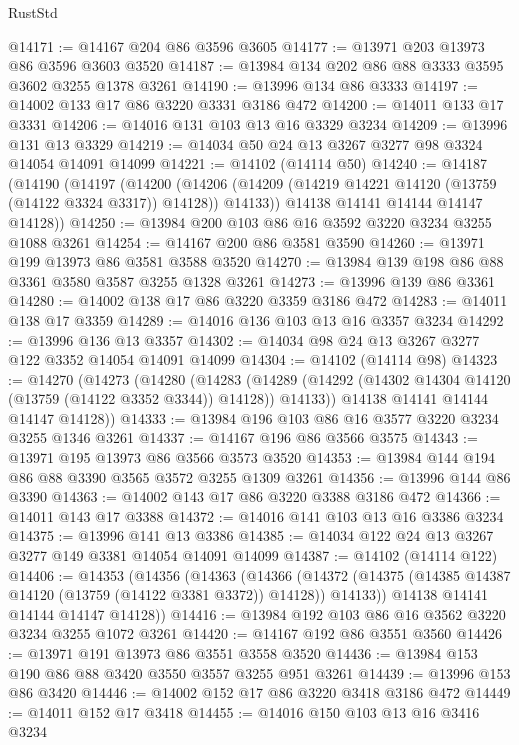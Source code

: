 \begin{lexlean}{RustStd}
\begin{coremodule}
@14171 := @14167 @204 @86 @3596 @3605
@14177 := @13971 @203 @13973 @86 @3596 @3603 @3520
@14187 := @13984 @134 @202 @86 @88 @3333 @3595 @3602 @3255 @1378 @3261
@14190 := @13996 @134 @86 @3333
@14197 := @14002 @133 @17 @86 @3220 @3331 @3186 @472
@14200 := @14011 @133 @17 @3331
@14206 := @14016 @131 @103 @13 @16 @3329 @3234
@14209 := @13996 @131 @13 @3329
@14219 := @14034 @50 @24 @13 @3267 @3277 @98 @3324 @14054 @14091 @14099
@14221 := @14102 (@14114 @50)
@14240 := @14187
    (@14190
      (@14197
        (@14200
          (@14206 (@14209 (@14219 @14221 @14120 (@13759 (@14122 @3324 @3317)) @14128)) @14133))
        @14138
        @14141
        @14144
        @14147
        @14128))
@14250 := @13984 @200 @103 @86 @16 @3592 @3220 @3234 @3255 @1088 @3261
@14254 := @14167 @200 @86 @3581 @3590
@14260 := @13971 @199 @13973 @86 @3581 @3588 @3520
@14270 := @13984 @139 @198 @86 @88 @3361 @3580 @3587 @3255 @1328 @3261
@14273 := @13996 @139 @86 @3361
@14280 := @14002 @138 @17 @86 @3220 @3359 @3186 @472
@14283 := @14011 @138 @17 @3359
@14289 := @14016 @136 @103 @13 @16 @3357 @3234
@14292 := @13996 @136 @13 @3357
@14302 := @14034 @98 @24 @13 @3267 @3277 @122 @3352 @14054 @14091 @14099
@14304 := @14102 (@14114 @98)
@14323 := @14270
    (@14273
      (@14280
        (@14283
          (@14289 (@14292 (@14302 @14304 @14120 (@13759 (@14122 @3352 @3344)) @14128)) @14133))
        @14138
        @14141
        @14144
        @14147
        @14128))
@14333 := @13984 @196 @103 @86 @16 @3577 @3220 @3234 @3255 @1346 @3261
@14337 := @14167 @196 @86 @3566 @3575
@14343 := @13971 @195 @13973 @86 @3566 @3573 @3520
@14353 := @13984 @144 @194 @86 @88 @3390 @3565 @3572 @3255 @1309 @3261
@14356 := @13996 @144 @86 @3390
@14363 := @14002 @143 @17 @86 @3220 @3388 @3186 @472
@14366 := @14011 @143 @17 @3388
@14372 := @14016 @141 @103 @13 @16 @3386 @3234
@14375 := @13996 @141 @13 @3386
@14385 := @14034 @122 @24 @13 @3267 @3277 @149 @3381 @14054 @14091 @14099
@14387 := @14102 (@14114 @122)
@14406 := @14353
    (@14356
      (@14363
        (@14366
          (@14372 (@14375 (@14385 @14387 @14120 (@13759 (@14122 @3381 @3372)) @14128)) @14133))
        @14138
        @14141
        @14144
        @14147
        @14128))
@14416 := @13984 @192 @103 @86 @16 @3562 @3220 @3234 @3255 @1072 @3261
@14420 := @14167 @192 @86 @3551 @3560
@14426 := @13971 @191 @13973 @86 @3551 @3558 @3520
@14436 := @13984 @153 @190 @86 @88 @3420 @3550 @3557 @3255 @951 @3261
@14439 := @13996 @153 @86 @3420
@14446 := @14002 @152 @17 @86 @3220 @3418 @3186 @472
@14449 := @14011 @152 @17 @3418
@14455 := @14016 @150 @103 @13 @16 @3416 @3234

\end{coremodule}
\end{lexlean}

